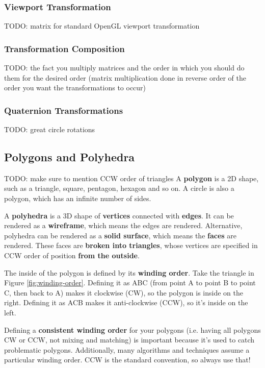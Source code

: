 \documentclass{article}
\begin{document}
\subsubsection{Viewport Transformation}

TODO: matrix for standard OpenGL viewport transformation

\subsubsection{Transformation Composition}

TODO: the fact you multiply matrices and the order in which you should do them for the desired order (matrix multiplication done in reverse order of the order you want the transformations to occur)

\subsubsection{Quaternion Transformations}

TODO: great circle rotations

\subsection{Polygons and Polyhedra}

TODO: make sure to mention CCW order of triangles
A \textbf{polygon} is a 2D shape, such as a triangle, square, pentagon, hexagon and so on. A circle is also a polygon, which has an infinite number of sides.

A \textbf{polyhedra} is a 3D shape of \textbf{vertices} connected with \textbf{edges}. It can be rendered as a \textbf{wireframe}, which means the edges are rendered. Alternative, polyhedra can be rendered as a \textbf{solid surface}, which means the \textbf{faces} are rendered. These faces are \textbf{broken into triangles}, whose vertices are specified in CCW order of position \textbf{from the outside}.

The inside of the polygon is defined by its \textbf{winding order}. Take the triangle in Figure \ref{fig:winding-order}. Defining it as ABC (from point A to point B to point C, then back to A) makes it clockwise (CW), so the polygon is inside on the right. Defining it as ACB makes it anti-clockwise (CCW), so it's inside on the left.

Defining a \textbf{consistent winding order} for your polygons (i.e. having all polygons CW or CCW, not mixing and matching) is important because it's used to catch problematic polygons. Additionally, many algorithms and techniques assume a particular winding order. CCW is the standard convention, so always use that!
\end{document}
